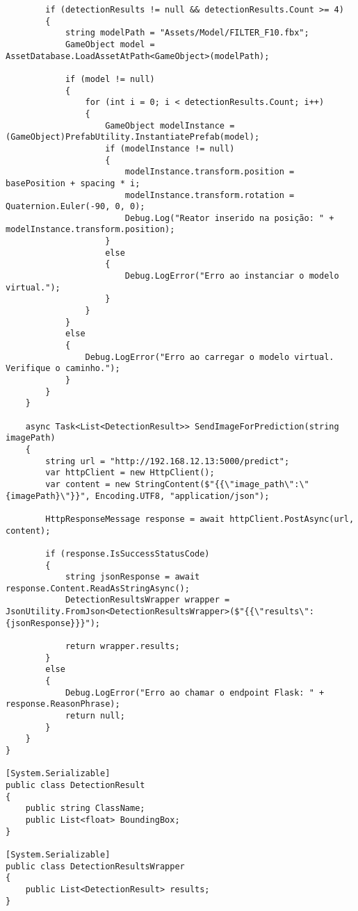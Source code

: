 \begin{lstlisting}
        if (detectionResults != null && detectionResults.Count >= 4)
        {
            string modelPath = "Assets/Model/FILTER_F10.fbx";
            GameObject model = AssetDatabase.LoadAssetAtPath<GameObject>(modelPath);

            if (model != null)
            {
                for (int i = 0; i < detectionResults.Count; i++)
                {
                    GameObject modelInstance = (GameObject)PrefabUtility.InstantiatePrefab(model);
                    if (modelInstance != null)
                    {
                        modelInstance.transform.position = basePosition + spacing * i;
                        modelInstance.transform.rotation = Quaternion.Euler(-90, 0, 0);
                        Debug.Log("Reator inserido na posição: " + modelInstance.transform.position);
                    }
                    else
                    {
                        Debug.LogError("Erro ao instanciar o modelo virtual.");
                    }
                }
            }
            else
            {
                Debug.LogError("Erro ao carregar o modelo virtual. Verifique o caminho.");
            }
        }
    }

    async Task<List<DetectionResult>> SendImageForPrediction(string imagePath)
    {
        string url = "http://192.168.12.13:5000/predict";
        var httpClient = new HttpClient();
        var content = new StringContent($"{{\"image_path\":\"{imagePath}\"}}", Encoding.UTF8, "application/json");

        HttpResponseMessage response = await httpClient.PostAsync(url, content);

        if (response.IsSuccessStatusCode)
        {
            string jsonResponse = await response.Content.ReadAsStringAsync();
            DetectionResultsWrapper wrapper = JsonUtility.FromJson<DetectionResultsWrapper>($"{{\"results\":{jsonResponse}}}");

            return wrapper.results;
        }
        else
        {
            Debug.LogError("Erro ao chamar o endpoint Flask: " + response.ReasonPhrase);
            return null;
        }
    }
}

[System.Serializable]
public class DetectionResult
{
    public string ClassName;
    public List<float> BoundingBox;
}

[System.Serializable]
public class DetectionResultsWrapper
{
    public List<DetectionResult> results;
}
\end{lstlisting}
